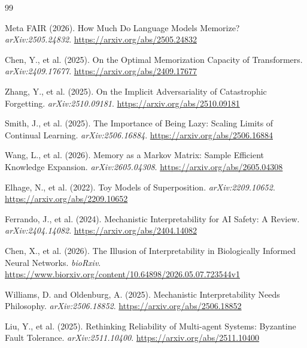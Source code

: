 \documentclass[11pt,letterpaper]{article}
\begin{document}

\begin{thebibliography}{99}

Meta FAIR (2026).
\newblock How Much Do Language Models Memorize?
\newblock \textit{arXiv:2505.24832}. \url{https://arxiv.org/abs/2505.24832}

Chen, Y., et al. (2025).
\newblock On the Optimal Memorization Capacity of Transformers.
\newblock \textit{arXiv:2409.17677}. \url{https://arxiv.org/abs/2409.17677}

Zhang, Y., et al. (2025).
\newblock On the Implicit Adversariality of Catastrophic Forgetting.
\newblock \textit{arXiv:2510.09181}. \url{https://arxiv.org/abs/2510.09181}

Smith, J., et al. (2025).
\newblock The Importance of Being Lazy: Scaling Limits of Continual Learning.
\newblock \textit{arXiv:2506.16884}. \url{https://arxiv.org/abs/2506.16884}

Wang, L., et al. (2026).
\newblock Memory as a Markov Matrix: Sample Efficient Knowledge Expansion.
\newblock \textit{arXiv:2605.04308}. \url{https://arxiv.org/abs/2605.04308}

Elhage, N., et al. (2022).
\newblock Toy Models of Superposition.
\newblock \textit{arXiv:2209.10652}. \url{https://arxiv.org/abs/2209.10652}

Ferrando, J., et al. (2024).
\newblock Mechanistic Interpretability for AI Safety: A Review.
\newblock \textit{arXiv:2404.14082}. \url{https://arxiv.org/abs/2404.14082}

Chen, X., et al. (2026).
\newblock The Illusion of Interpretability in Biologically Informed Neural Networks.
\newblock \textit{bioRxiv}. \url{https://www.biorxiv.org/content/10.64898/2026.05.07.723544v1}

Williams, D. and Oldenburg, A. (2025).
\newblock Mechanistic Interpretability Needs Philosophy.
\newblock \textit{arXiv:2506.18852}. \url{https://arxiv.org/abs/2506.18852}

Liu, Y., et al. (2025).
\newblock Rethinking Reliability of Multi-agent Systems: Byzantine Fault Tolerance.
\newblock \textit{arXiv:2511.10400}. \url{https://arxiv.org/abs/2511.10400}


\end{thebibliography}
\end{document}
